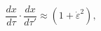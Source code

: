 \begin{equation}
\frac{dx}{d\tau} \cdot \frac{dx}{d\tau'}\approx \left( 1+ \dot{\varepsilon}^2\right),
\end{equation}

